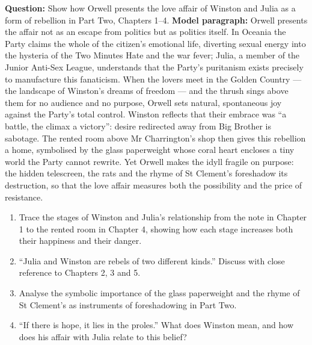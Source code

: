 \documentclass[11pt]{article}
\begin{document}
\begin{exoresolu}
\textbf{Question:} Show how Orwell presents the love affair of Winston and Julia as a form of rebellion in Part Two, Chapters 1--4.
\tcblower
\textbf{Model paragraph:} Orwell presents the affair not as an escape from politics but as politics itself. In Oceania the Party claims the whole of the citizen's emotional life, diverting sexual energy into the hysteria of the Two Minutes Hate and the war fever; Julia, a member of the Junior Anti-Sex League, understands that the Party's puritanism exists precisely to manufacture this fanaticism. When the lovers meet in the Golden Country --- the landscape of Winston's dreams of freedom --- and the thrush sings above them for no audience and no purpose, Orwell sets natural, spontaneous joy against the Party's total control. Winston reflects that their embrace was ``a battle, the climax a victory'': desire redirected away from Big Brother is sabotage. The rented room above Mr Charrington's shop then gives this rebellion a home, symbolised by the glass paperweight whose coral heart encloses a tiny world the Party cannot rewrite. Yet Orwell makes the idyll fragile on purpose: the hidden telescreen, the rats and the rhyme of St Clement's foreshadow its destruction, so that the love affair measures both the possibility and the price of resistance.
\end{exoresolu}

\begin{exercice}
\begin{enumerate}
\item Trace the stages of Winston and Julia's relationship from the note in Chapter 1 to the rented room in Chapter 4, showing how each stage increases both their happiness and their danger.
\item ``Julia and Winston are rebels of two different kinds.'' Discuss with close reference to Chapters 2, 3 and 5.
\item Analyse the symbolic importance of the glass paperweight and the rhyme of St Clement's as instruments of foreshadowing in Part Two.
\item ``If there is hope, it lies in the proles.'' What does Winston mean, and how does his affair with Julia relate to this belief?
\end{enumerate}
\end{exercice}
\end{document}
